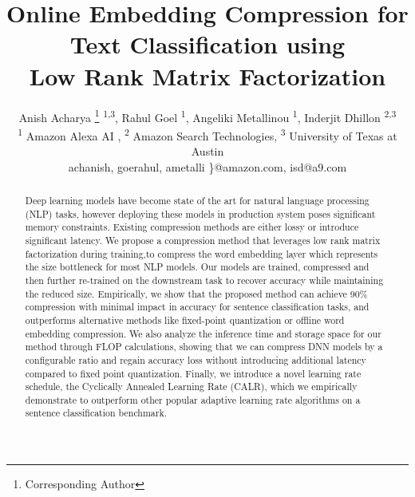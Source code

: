 \documentclass[letterpaper]{article} %
\begin{document}
\title{Online Embedding Compression for Text Classification using\\
	  Low Rank Matrix Factorization}
  \author{Anish Acharya \thanks{Corresponding Author} \textsuperscript{1,3}, Rahul Goel \textsuperscript{1}, Angeliki Metallinou \textsuperscript{1}, Inderjit Dhillon \textsuperscript{2,3} \\ \textsuperscript{1} Amazon Alexa AI , \textsuperscript{2} Amazon Search Technologies, \textsuperscript{3} University of Texas at Austin\\  {achanish, goerahul, ametalli \}@amazon.com}, isd@a9.com }
\maketitle
\begin{abstract}
Deep learning models have become state of the art for natural language processing (NLP) tasks, however deploying these models in production system poses significant memory constraints. Existing compression methods are either lossy or introduce significant latency. We propose a compression method that leverages low rank matrix factorization during training,to compress the word embedding layer which represents the size bottleneck for most NLP models. Our models are trained, compressed and then further re-trained on the downstream task to recover accuracy while maintaining the reduced size. Empirically, we show that the proposed method can achieve 90\% compression with minimal impact in accuracy for sentence classification tasks, and outperforms alternative methods like fixed-point quantization or offline word embedding compression. We also analyze the inference time and storage space for our method through FLOP calculations, showing that we can compress DNN models by a configurable ratio and regain accuracy loss without introducing additional latency compared to fixed point quantization. Finally, we introduce a novel learning rate schedule, the Cyclically Annealed Learning Rate (CALR), which we empirically demonstrate to outperform other popular adaptive learning rate algorithms on a sentence classification benchmark.

\end{abstract}






\end{document}
